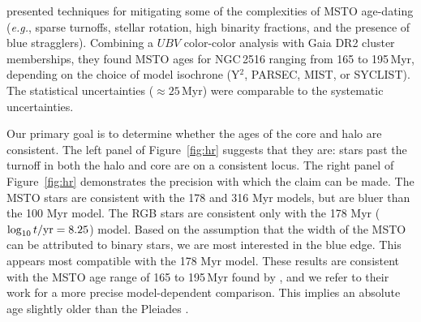 \documentclass[12pt,twocolumn,tighten]{aastex63}
\begin{document}
\citet{cummings_2018} presented techniques for mitigating some of the
complexities of MSTO age-dating ({\it e.g.}, sparse turnoffs, stellar
rotation, high binarity fractions, and the presence of blue
stragglers).  Combining a $UBV$ color-color analysis with Gaia DR2
cluster memberships, they found MSTO ages for NGC\,2516 ranging from
165 to 195\,Myr, depending on the choice of model isochrone (Y$^2$,
PARSEC, MIST, or SYCLIST).  The statistical uncertainties ($\approx
25$\,Myr) were comparable to the systematic uncertainties.

Our primary goal is to determine whether the ages of the core and halo
are consistent.  The left panel of Figure~\ref{fig:hr} suggests that
they are: stars past the turnoff in both the halo and core are on a
consistent locus.  The right panel of Figure~\ref{fig:hr} demonstrates
the precision with which the claim can be made.  The MSTO stars are
consistent with the 178 and 316 Myr models, but are bluer than the 100
Myr model.  The RGB stars are consistent only with the 178 Myr
($\log_{10} t/{\rm yr} = 8.25$) model.  Based on the assumption that
the width of the MSTO can be attributed to binary stars, we are most
interested in the blue edge. This appears most compatible with the 178
Myr model.  These results are consistent with the MSTO age range of
165 to 195\,Myr found by \citet{cummings_2018}, and we refer to their
work for a more precise model-dependent comparison.
This implies an absolute age slightly older than the Pleiades
\citep[cf.][]{mermilliod_comparative_1981}.


% 
\end{document}
